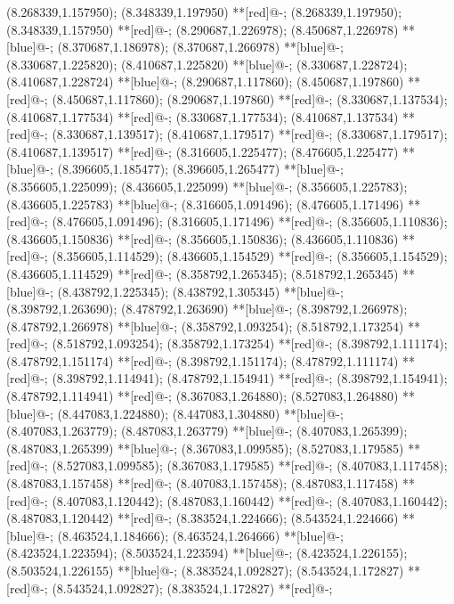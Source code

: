 (8.268339,1.157950); (8.348339,1.197950) **[red]@{-};
(8.268339,1.197950); (8.348339,1.157950) **[red]@{-};
(8.290687,1.226978); (8.450687,1.226978) **[blue]@{-};
(8.370687,1.186978); (8.370687,1.266978) **[blue]@{-};
(8.330687,1.225820); (8.410687,1.225820) **[blue]@{-};
(8.330687,1.228724); (8.410687,1.228724) **[blue]@{-};
(8.290687,1.117860); (8.450687,1.197860) **[red]@{-};
(8.450687,1.117860); (8.290687,1.197860) **[red]@{-};
(8.330687,1.137534); (8.410687,1.177534) **[red]@{-};
(8.330687,1.177534); (8.410687,1.137534) **[red]@{-};
(8.330687,1.139517); (8.410687,1.179517) **[red]@{-};
(8.330687,1.179517); (8.410687,1.139517) **[red]@{-};
(8.316605,1.225477); (8.476605,1.225477) **[blue]@{-};
(8.396605,1.185477); (8.396605,1.265477) **[blue]@{-};
(8.356605,1.225099); (8.436605,1.225099) **[blue]@{-};
(8.356605,1.225783); (8.436605,1.225783) **[blue]@{-};
(8.316605,1.091496); (8.476605,1.171496) **[red]@{-};
(8.476605,1.091496); (8.316605,1.171496) **[red]@{-};
(8.356605,1.110836); (8.436605,1.150836) **[red]@{-};
(8.356605,1.150836); (8.436605,1.110836) **[red]@{-};
(8.356605,1.114529); (8.436605,1.154529) **[red]@{-};
(8.356605,1.154529); (8.436605,1.114529) **[red]@{-};
(8.358792,1.265345); (8.518792,1.265345) **[blue]@{-};
(8.438792,1.225345); (8.438792,1.305345) **[blue]@{-};
(8.398792,1.263690); (8.478792,1.263690) **[blue]@{-};
(8.398792,1.266978); (8.478792,1.266978) **[blue]@{-};
(8.358792,1.093254); (8.518792,1.173254) **[red]@{-};
(8.518792,1.093254); (8.358792,1.173254) **[red]@{-};
(8.398792,1.111174); (8.478792,1.151174) **[red]@{-};
(8.398792,1.151174); (8.478792,1.111174) **[red]@{-};
(8.398792,1.114941); (8.478792,1.154941) **[red]@{-};
(8.398792,1.154941); (8.478792,1.114941) **[red]@{-};
(8.367083,1.264880); (8.527083,1.264880) **[blue]@{-};
(8.447083,1.224880); (8.447083,1.304880) **[blue]@{-};
(8.407083,1.263779); (8.487083,1.263779) **[blue]@{-};
(8.407083,1.265399); (8.487083,1.265399) **[blue]@{-};
(8.367083,1.099585); (8.527083,1.179585) **[red]@{-};
(8.527083,1.099585); (8.367083,1.179585) **[red]@{-};
(8.407083,1.117458); (8.487083,1.157458) **[red]@{-};
(8.407083,1.157458); (8.487083,1.117458) **[red]@{-};
(8.407083,1.120442); (8.487083,1.160442) **[red]@{-};
(8.407083,1.160442); (8.487083,1.120442) **[red]@{-};
(8.383524,1.224666); (8.543524,1.224666) **[blue]@{-};
(8.463524,1.184666); (8.463524,1.264666) **[blue]@{-};
(8.423524,1.223594); (8.503524,1.223594) **[blue]@{-};
(8.423524,1.226155); (8.503524,1.226155) **[blue]@{-};
(8.383524,1.092827); (8.543524,1.172827) **[red]@{-};
(8.543524,1.092827); (8.383524,1.172827) **[red]@{-};
